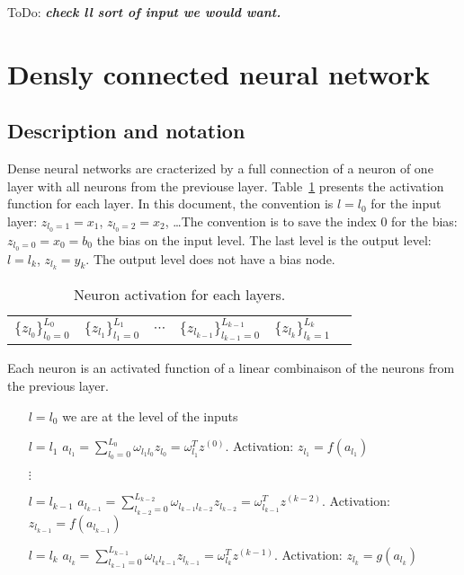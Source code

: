 \documentclass[final, paper=letter,5p,times,twocolumn]{elsarticle}
\newcommand{\ToDo}[1]{ToDo: \textbf{\textit{#1}}}
\begin{document}
\ToDo{check ll sort of input we would want.} \\

\section{Densly connected neural network}
\subsection{Description and notation}

Dense neural networks are cracterized by a full connection of a neuron of one layer with all neurons from the previouse layer. Table~\ref{Layers_activations} presents the activation function for each layer. In this document, the convention is $l = l_{0}$ for the input layer: $z_{l_{0} = 1} = x_{1}$, $z_{l_{0} = 2} = x_{2}$, \dots The convention is to save the index 0 for the bias: $z_{l_{0} = 0} = x_{0} = b_{0}$ the bias on the input level. The last level is the output level: $l = l_{k}$, $z_{l_{k}} = y_{k}$. The output level does not have a bias node.

\begin{table}[]
\centering
\caption{Neuron activation for each layers.}
\label{Layers_activations}
\begin{tabular}{llllll}
 $\{ z_{l_{0}}\}_{l_{0} = 0}^{L_{0}}$&  $\{ z_{l_{1}}\}_{l_{1} = 0}^{L_{1}}$ &  $\cdots$ & $\{ z_{l_{k-1}}\}_{l_{k-1} = 0}^{L_{k-1}}$ &  $\{ z_{l_{k}}\}_{l_{k} = 1}^{L_{k}}$ &  \\ 
\end{tabular}
\end{table}

Each neuron is an activated function of a linear combinaison of the neurons from the previous layer.

\begin{itemize}
    \item [$l = l_{0}$] we are at the level of the inputs
    \item [$l = l_{1}$] $a_{l_{1}} = \sum_{l_{0} = 0}^{L_{0}} \omega_{l_{1}l_{0}} z_{l_{0}} = \omega_{l_{1}}^{T} z^{(0)}$. Activation: $z_{l_{1}} = f(a_{l_{1}})$
    \item [$\vdots$]
    \item [$l = l_{k-1}$] $a_{l_{k-1}} = \sum_{l_{k-2} = 0}^{L_{k-2}} \omega_{l_{k-1}l_{k-2}} z_{l_{k-2}} = \omega_{l_{k-1}}^{T} z^{(k-2)}$. Activation: $z_{l_{k-1}} = f(a_{l_{k-1}})$
    \item [$l = l_{k}$] $a_{l_{k}} = \sum_{l_{k-1} = 0}^{L_{k-1}} \omega_{l_{k}l_{k-1}} z_{l_{k-1}} = \omega_{l_{k}}^{T} z^{(k-1)}$. Activation: $z_{l_{k}} = g(a_{l_{k}})$
\end{itemize}
\end{document}

